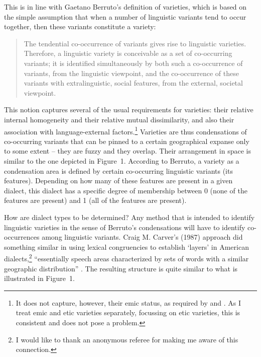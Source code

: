 \documentclass[output=paper]{LSP/langsci}
\begin{document}
This is in line with Gaetano Berruto’s definition of varieties, which is based on the simple assumption that when a number of linguistic variants tend to occur together, then these variants constitute a variety:

\begin{quote}
The tendential co-occurrence of variants gives rise to linguistic varieties. Therefore, a linguistic variety is conceivable as a set of co-occurring variants; it is identified simultaneously by both such a co-occurrence of variants, from the linguistic viewpoint, and the co-occurrence of these variants with extralinguistic, social features, from the external, societal viewpoint.\\
\citep[229]{auer_identifying_2010}
\end{quote}

This notion captures several of the usual requirements for varieties: their relative internal homogeneity and their relative mutual dissimilarity, and also their association with language-external factors.\footnote{   It does not capture, however, their emic status, as required by \citet[99]{auer_konversationelle_1986} and \citet[389--390]{lenz_struktur_2003}. As I treat emic and etic varieties separately, focussing on etic varieties, this is consistent and does not pose a problem.} Varieties are thus condensations of co-occurring variants that can be pinned to a certain geographical expanse only to some extent – they are fuzzy and they overlap. Their arrangement in space is similar to the one depicted in Figure~1. According to Berruto, a variety as a condensation area is defined by certain co-occurring linguistic variants (its features). Depending on how many of these features are present in a given dialect, this dialect has a specific degree of membership between 0 (none of the features are present) and 1 (all of the features are present).

How are dialect types to be determined? Any method that is intended to identify linguistic varieties in the sense of Berruto’s condensations will have to identify co-occurrences among linguistic variants. Craig M. Carver’s (1987) %
approach did something similar in using lexical congruencies to establish ‘layers’ in American dialects,\footnote{I would like to thank an anonymous referee for making me aware of this connection.} “essentially speech areas characterized by sets of words with a similar geographic distribution” \citep[24]{boberg_north_2005}. The resulting structure is quite similar to what is illustrated in Figure~1. 
\end{document}

